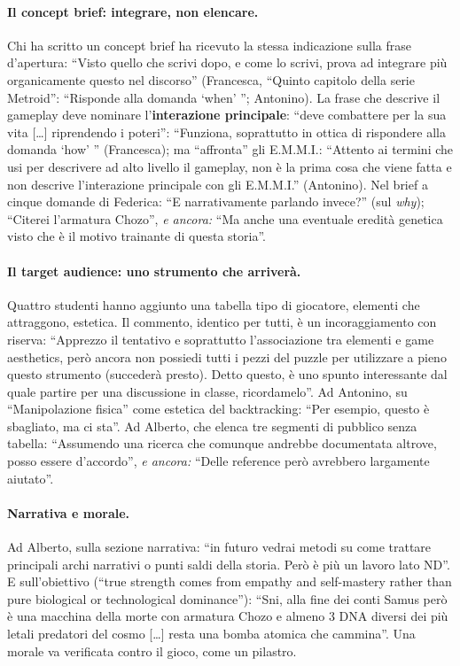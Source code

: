 \paragraph{Il concept brief: integrare, non elencare.} Chi ha scritto un
concept brief ha ricevuto la stessa indicazione sulla frase d'apertura:
``Visto quello che scrivi dopo, e come lo scrivi, prova ad integrare più
organicamente questo nel discorso'' (Francesca, ``Quinto capitolo della serie
Metroid'': ``Risponde alla domanda `when' ''; Antonino). La frase che descrive
il gameplay deve nominare l'\textbf{interazione principale}: ``deve
combattere per la sua vita [\dots] riprendendo i poteri'': ``Funziona,
soprattutto in ottica di rispondere alla domanda `how' '' (Francesca); ma
``affronta'' gli E.M.M.I.: ``Attento ai termini che usi per descrivere ad
alto livello il gameplay, non è la prima cosa che viene fatta e non descrive
l'interazione principale con gli E.M.M.I.'' (Antonino). Nel brief a cinque
domande di Federica: ``E narrativamente parlando invece?'' (sul \emph{why});
``Citerei l'armatura Chozo'', \emph{e ancora:} ``Ma anche una eventuale
eredità genetica visto che è il motivo trainante di questa storia''.

\paragraph{Il target audience: uno strumento che arriverà.} Quattro studenti
hanno aggiunto una tabella tipo di giocatore, elementi che attraggono,
estetica. Il commento, identico per tutti, è un incoraggiamento con riserva:
``Apprezzo il tentativo e soprattutto l'associazione tra elementi e game
aesthetics, però ancora non possiedi tutti i pezzi del puzzle per utilizzare
a pieno questo strumento (succederà presto). Detto questo, è uno spunto
interessante dal quale partire per una discussione in classe, ricordamelo''.
Ad Antonino, su ``Manipolazione fisica'' come estetica del backtracking:
``Per esempio, questo è sbagliato, ma ci sta''. Ad Alberto, che elenca tre
segmenti di pubblico senza tabella: ``Assumendo una ricerca che comunque
andrebbe documentata altrove, posso essere d'accordo'', \emph{e ancora:}
``Delle reference però avrebbero largamente aiutato''.

\paragraph{Narrativa e morale.} Ad Alberto, sulla sezione narrativa: ``in
futuro vedrai metodi su come trattare principali archi narrativi o punti
saldi della storia. Però è più un lavoro lato ND''. E sull'obiettivo (``true
strength comes from empathy and self-mastery rather than pure biological or
technological dominance''): ``Sni, alla fine dei conti Samus però è una
macchina della morte con armatura Chozo e almeno 3 DNA diversi dei più letali
predatori del cosmo [\dots] resta una bomba atomica che cammina''. Una morale
va verificata contro il gioco, come un pilastro.

